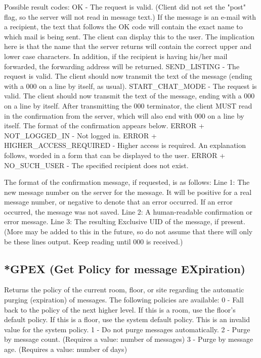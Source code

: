  Possible result codes:
  OK  -  The request is valid.  (Client did not set the "post" flag, so the
server will not read in message text.)   If the message is an e-mail with
a recipient, the text that follows the OK code will contain the exact name
to which mail is being sent.  The client can display this to the user.  The
implication here is that the name that the server returns will contain the
correct upper and lower case characters.  In addition, if the recipient is
having his/her mail forwarded, the forwarding address will be returned.
  SEND_LISTING  -  The request is valid.  The client should now transmit
the text of the message (ending with a 000 on a line by itself, as usual).
  START_CHAT_MODE  -  The request is valid.  The client should now transmit
the text of the message, ending with a 000 on a line by itself.  After
transmitting the 000 terminator, the client MUST read in the confirmation
from the server, which will also end with 000 on a line by itself.  The format
of the confirmation appears below.
  ERROR + NOT_LOGGED_IN  -  Not logged in.
  ERROR + HIGHER_ACCESS_REQUIRED  -  Higher access is required.  An
explanation follows, worded in a form that can be displayed to the user.
  ERROR + NO_SUCH_USER  -  The specified recipient does not exist.

The format of the confirmation message, if requested, is as follows:
Line 1: The new message number on the server for the message.  It will be
        positive for a real message number, or negative to denote
        that an error occurred.  If an error occurred, the message was
        not saved.
Line 2: A human-readable confirmation or error message.
Line 3: The resulting Exclusive UID of the message, if present.
(More may be added to this in the future, so do not assume that there will
only be these lines output.  Keep reading until 000 is received.)



\subsection{*GPEX (Get Policy for message EXpiration)}

 Returns the policy of the current room, floor, or site regarding the automatic
purging (expiration) of messages.  The following policies are available:
   0  -  Fall back to the policy of the next higher level.  If this is a room,
         use the floor's default policy.  If this is a floor, use the system
         default policy.  This is an invalid value for the system policy.
   1  -  Do not purge messages automatically.
   2  -  Purge by message count.  (Requires a value: number of messages)
   3  -  Purge by message age.  (Requires a value: number of days)


